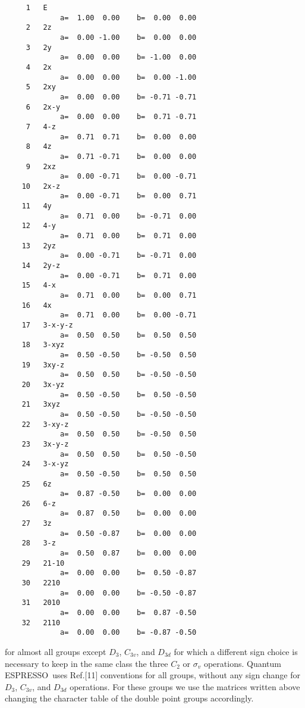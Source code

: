 \documentclass[12pt,a4paper,twoside]{report}
\def\qe{{\sc Quantum ESPRESSO}}
\begin{document}
\begin{tcolorbox}
\begin{footnotesize}
\begin{verbatim}
     1   E       
             a=  1.00  0.00    b=  0.00  0.00   
     2   2z      
             a=  0.00 -1.00    b=  0.00  0.00    
     3   2y      
             a=  0.00  0.00    b= -1.00  0.00    
     4   2x      
             a=  0.00  0.00    b=  0.00 -1.00   
     5   2xy     
             a=  0.00  0.00    b= -0.71 -0.71    
     6   2x-y    
             a=  0.00  0.00    b=  0.71 -0.71     
     7   4-z     
             a=  0.71  0.71    b=  0.00  0.00  
     8   4z      
             a=  0.71 -0.71    b=  0.00  0.00   
     9   2xz     
             a=  0.00 -0.71    b=  0.00 -0.71  
    10   2x-z    
             a=  0.00 -0.71    b=  0.00  0.71     
    11   4y      
             a=  0.71  0.00    b= -0.71  0.00   
    12   4-y     
             a=  0.71  0.00    b=  0.71  0.00   
    13   2yz     
             a=  0.00 -0.71    b= -0.71  0.00  
    14   2y-z    
             a=  0.00 -0.71    b=  0.71  0.00  
    15   4-x     
             a=  0.71  0.00    b=  0.00  0.71  
    16   4x      
             a=  0.71  0.00    b=  0.00 -0.71   
    17   3-x-y-z 
             a=  0.50  0.50    b=  0.50  0.50    
    18   3-xyz   
             a=  0.50 -0.50    b= -0.50  0.50   
    19   3xy-z   
             a=  0.50  0.50    b= -0.50 -0.50   
    20   3x-yz   
             a=  0.50 -0.50    b=  0.50 -0.50  
    21   3xyz    
             a=  0.50 -0.50    b= -0.50 -0.50  
    22   3-xy-z  
             a=  0.50  0.50    b= -0.50  0.50    
    23   3x-y-z  
             a=  0.50  0.50    b=  0.50 -0.50    
    24   3-x-yz  
             a=  0.50 -0.50    b=  0.50  0.50    
    25   6z      
             a=  0.87 -0.50    b=  0.00  0.00    
    26   6-z     
             a=  0.87  0.50    b=  0.00  0.00    
    27   3z      
             a=  0.50 -0.87    b=  0.00  0.00    
    28   3-z     
             a=  0.50  0.87    b=  0.00  0.00    
    29   21-10   
             a=  0.00  0.00    b=  0.50 -0.87      
    30   2210    
             a=  0.00  0.00    b= -0.50 -0.87    
    31   2010    
             a=  0.00  0.00    b=  0.87 -0.50     
    32   2110    
             a=  0.00  0.00    b= -0.87 -0.50    
\end{verbatim}
\end{footnotesize}
\end{tcolorbox}

for almost all groups except $D_3$, $C_{3v}$, and $D_{3d}$ for which
a different sign choice is necessary to keep in the same class the three
$C_2$ or $\sigma_v$ operations. \qe\ uses 
Ref.[11] conventions for all groups, without any sign change for
$D_3$, $C_{3v}$, and $D_{3d}$ operations. For these groups we use the
matrices written above changing the character table of the double point 
groups accordingly. 
\end{document}
